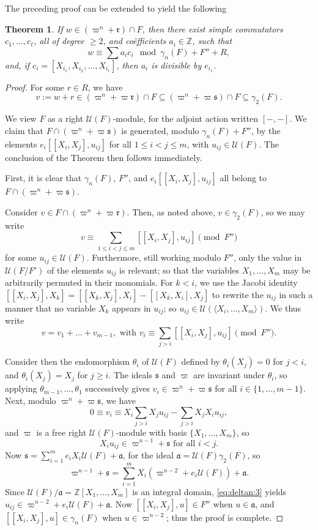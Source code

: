 \documentclass[a4paper,reqno,notitlepage]{amsart}
\newtheorem{theorem}{Theorem}[section]
\theoremstyle{definition}
\newcommand{\Z}{\mathbb Z}
\newcommand\rr{{\mathfrak r}}
\renewcommand\ss{{\mathfrak s}}
\newcommand\U{\mathscr U}
\begin{document}
\noindent The preceding proof can be extended to yield the following
\begin{theorem}\label{thm:deltan}
  If $w\in(\varpi^n+\rr)\cap F$, then there exist simple
  commutators $c_1,\dots,c_\ell$, all of degree $\geq 2$, and
  co\"efficients $a_i\in\Z$, such that
  \[w\equiv\sum a_ic_i\mod\gamma_n(F)+F''+R,
  \]
  and, if $c_i=[X_{i_1},X_{i_2},\dots,X_{i_r}]$, then $a_i$ is
  divisible by $e_{i_1}$.
\end{theorem}
\begin{proof}
  For some $r\in R$, we have
  \[v:=w+r\in(\varpi^n+\varpi\rr)\cap F\subseteq 
  (\varpi^n+\varpi\ss)\cap F\subseteq\gamma_2(F).
  \]

  We view $F$ as a right $\U(F)$-module, for the adjoint action
  written $[-,-]$.  We claim that $F\cap(\varpi^n+\varpi\ss)$ is
  generated, modulo $\gamma_n(F)+F''$, by the elements
  $e_i[[X_i,X_j],u_{ij}]$ for all $1\le i<j\le m$, with
  $u_{ij}\in\U(F)$. The conclusion of the Theorem then follows
  immediately.

  First, it is clear that $\gamma_n(F)$, $F''$, and
  $e_i[[X_i,X_j],u_{ij}]$ all belong to $F\cap(\varpi^n+\varpi\ss)$.

  Consider $v\in F\cap(\varpi^n+\varpi\rr)$. Then, as noted
  above, $v\in\gamma_2(F)$, so we may write
  \[v\equiv\sum_{1\le i<j\le m}[[X_i,X_j],u_{ij}]\pmod{F''}
  \]
  for some $u_{ij}\in\U(F)$. Furthermore, still working modulo $F''$,
  only the value in $\U(F/F')$ of the elements $u_{ij}$ is relevant;
  so that the variables $X_1,\dots,X_m$ may be arbitrarily permuted in
  their monomials. For $k<i$, we use the Jacobi identity
  $[[X_i,X_j],X_k]=[[X_k,X_j],X_i]-[[X_k,X_i],X_j]$ to rewrite the
  $u_{ij}$ in such a manner that no variable $X_k$ appears in
  $u_{ij}$; so $u_{ij}\in\U(\langle X_i,\dots,X_m\rangle)$.  We
  thus write
  \[v=v_1+\dots+v_{m-1},\text{ with }v_i\equiv\sum_{j>i}[[X_i,X_j],u_{ij}]\pmod{F''}.\]

  Consider then the endomorphism $\theta_i$ of $\U(F)$ defined by
  $\theta_i(X_j)=0$ for $j<i$, and $\theta_i(X_j)=X_j$ for $j\ge
  i$. The ideals $\ss$ and $\varpi$ are invariant under $\theta_i$, so
  applying $\theta_{m-1},\dots,\theta_1$ successively gives
  $v_i\in\varpi^n+\varpi\ss$ for all $i\in\{1,\dots,m-1\}$.  Next,
  modulo $\varpi^n+\varpi\ss$, we have
  \[0 \equiv v_i \equiv X_i\sum_{j>i} X_j u_{ij} - \sum_{j>i}X_jX_i u_{ij},
  \]
  and $\varpi$ is a free right $\U(F)$-module with basis
  $\{X_1,\dots,X_m\}$, so
  \begin{equation}\label{eq:deltan:3}
    X_i u_{ij}\in\varpi^{n-1}+\ss\text{ for all }i<j.
  \end{equation}
  Now $\ss=\sum_{i=1}^m e_iX_i\U(F)+\mathfrak a$, for the ideal
  $\mathfrak a=\U(F)\gamma_2(F)$, so
  \[\varpi^{n-1}+\ss=\sum_{i=1}^m X_i(\varpi^{n-2}+e_i\U(F))+\mathfrak a.\]
  Since $\U(F)/\mathfrak a=\Z[X_1,\dots,X_m]$ is an integral domain,
  \eqref{eq:deltan:3} yields
  $u_{ij}\in\varpi^{n-2}+e_i\U(F)+\mathfrak a$. Now $[[X_i,X_j],u]\in
  F''$ when $u\in\mathfrak a$, and $[[X_i,X_j],u]\in\gamma_n(F)$ when
  $u\in\varpi^{n-2}$; thus the proof is complete.
\end{proof}
\end{document}
